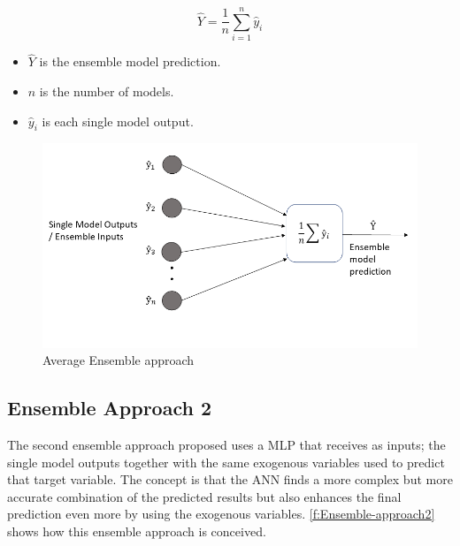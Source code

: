 \begin{equation}\label{eq:avg-ensemble}
    \hat{Y} = \frac{1}{n} \sum_{i=1}^{n}  \hat{y}_i
\end{equation}

\begin{itemize}
    \item \begin{math}\hat{Y}\end{math} is the ensemble model prediction.
    \item \begin{math}n\end{math} is the number of models.
    \item \begin{math}\hat{y}_i\end{math} is each single model output.
\end{itemize}

\begin{figure}[h]
\centering
\includegraphics[width=\linewidth]{figures/Ch4/Ensemble_Approach1.png}
\caption{Average Ensemble approach}
\label{f:Ensemble-approach1}
\end{figure}

\subsection{Ensemble Approach 2}
\label{s:Ensemble-Approach2}
The second ensemble approach proposed uses a \ac{MLP} that receives as inputs; the single model outputs together with the same exogenous variables used to predict that target variable. The concept is that the \ac{ANN} finds a more complex but more accurate combination of the predicted results but also enhances the final prediction even more by using the exogenous variables. \autoref{f:Ensemble-approach2} shows how this ensemble approach is conceived. 

